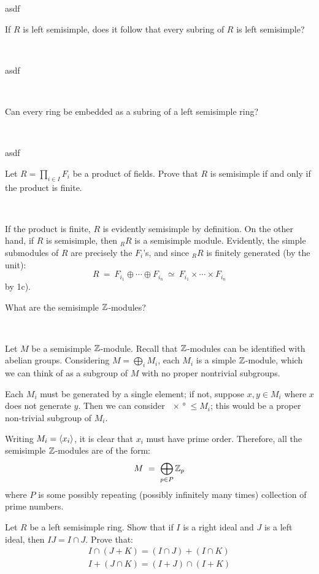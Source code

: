 \begin{pf}
	asdf
\end{pf}


\nq
\begin{exr}[title=Exercise 2.1 part a)] %
	If $R$ is left semisimple, does it follow that
	every subring of $R$ is left semisimple?
\end{exr} \

\begin{pf}
	asdf
\end{pf} \

\begin{exr}[title=Exercise 2.1 part b)] %
	Can every ring be embedded as a subring of a left semisimple ring?
\end{exr} \

\begin{pf}
	asdf
\end{pf}


\nq
\begin{exr}[title=Exercise 2.2]
	Let $R=\prod_{i\in I}F_i$ be a product of fields.
	Prove that $R$ is semisimple if and only if the product is finite.
\end{exr} \

\begin{pf}
	If the product is finite, $R$ is evidently semisimple by definition.
	On the other hand, if $R$ is semisimple, then $_{R}R$ is a semisimple
	module.
	Evidently, the simple submodules of $R$ are precisely the $F_{i}$'s,
	and since $_{R}R$ is finitely generated (by the unit):
	\begin{equation*}
		R \ = \ F_{i_{1}} \oplus \cdots \oplus F_{i_{n}}
		\ \simeq \ F_{i_{1}} \times \cdots \times F_{i_{n}}
	\end{equation*}
	by 1c).
\end{pf}


\nq
\begin{exr}[title=Exercise 2.3]
	What are the semisimple $\mathbb{Z}$-modules?
\end{exr} \

\begin{pf}
	Let $M$ be a semisimple $\mathbb{Z}$-module.
	Recall that $\mathbb{Z}$-modules can be identified with abelian groups.
	Considering $M=\bigoplus_{i}M_{i}$, each $M_{i}$ is a simple $\mathbb{Z}$-module,
	which we can think of as a subgroup of $M$ with no proper nontrivial subgroups.

	Each $M_{i}$ must be generated by a single element;
	if not, suppose $x,y\in M_{i}$ where $x$ does not generate $y$.
	Then we can consider $\ang{x}\leq M_{i}$;
	this would be a proper non-trivial subgroup of $M_{i}$.

	Writing $M_{i}=\left\langle{x_{i}}\right\rangle$, it is clear that $x_{i}$ must have prime order.
	Therefore, all the semisimple $\mathbb{Z}$-modules are of the form:
	\begin{equation*}
		M \ = \ \bigoplus_{p\in P}\mathbb{Z}_{p}
	\end{equation*}
	where $P$ is some possibly repeating (possibly infinitely many times)
	collection of prime numbers.
\end{pf}


\nq
\begin{exr}[title=Exercise 2.5] %
	Let $R$ be a left semisimple ring.
	Show that if $I$ is a right ideal and $J$ is a left ideal, then
	$IJ=I\cap J$. Prove that:
	\begin{gather*}
		I\cap (J+K)= (I\cap J)+(I\cap K) \\
        I+(J\cap K) = (I+J)\cap (I+K)
	\end{gather*}
\end{exr}
